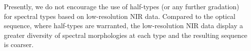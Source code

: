 \documentclass[12pt,preprint]{aastex}
\begin{document}

Presently, we do not encourage the use of half-types (or any further gradation) for spectral types based on low-resolution NIR data.
Compared to the optical sequence, where half-types are warranted, the low-resolution NIR data display a greater diversity of spectral morphologies at each type and the resulting sequence is coarser.

\end{document}
